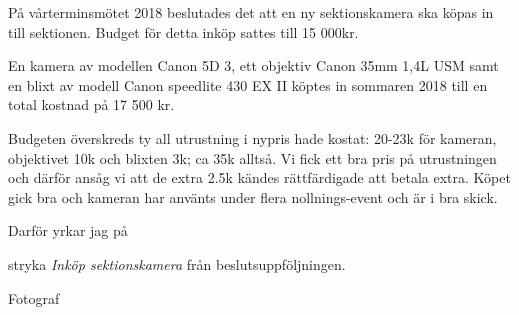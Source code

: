 \documentclass[../_main/handlingar.tex]{subfiles}
\begin{document}

På vårterminsmötet 2018 beslutades det att en ny sektionskamera ska köpas in till sektionen. Budget för detta inköp sattes till 15 000kr.

En kamera av modellen Canon 5D 3, ett objektiv Canon 35mm 1,4L USM samt en blixt av modell Canon speedlite 430 EX II  köptes in sommaren 2018 till en total kostnad på 17 500 kr. 

Budgeten överskreds ty all utrustning i nypris hade kostat: 20-23k för kameran, objektivet 10k och blixten 3k; ca 35k alltså. Vi fick ett bra pris på utrustningen och därför ansåg vi att de extra 2.5k kändes rättfärdigade att betala extra. Köpet gick bra och kameran har använts under flera nollnings-event och är i bra skick. 

Darför yrkar jag på
\begin{attsatser}
    \att stryka \emph{Inköp sektionskamera} från beslutsuppföljningen.
\end{attsatser}

\begin{signatures}{2}
    \mvh
    \signature{Eltayeb Bayomi}{Fotograf}
\end{signatures}
\end{document}

